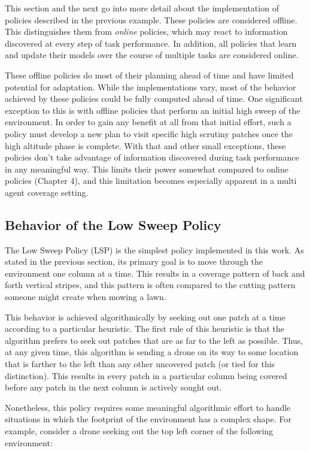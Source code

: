 This section and the next go into more detail about the implementation of policies described in the previous example. These policies are considered offline. This distinguishes them from \textit{online} policies, which may react to information discovered at every step of task performance. In addition, all policies that learn and update their models over the course of multiple tasks are considered online.

These offline policies do most of their planning ahead of time and have limited potential for adaptation. While the implementations vary, most of the behavior achieved by these policies could be fully computed ahead of time. One significant exception to this is with offline policies that perform an initial high sweep of the environment. In order to gain any benefit at all from that initial effort, such a policy must develop a new plan to visit specific high scrutiny patches once the high altitude phase is complete. With that and other small exceptions, these policies don't take advantage of information discovered during task performance in any meaningful way. This limits their power somewhat compared to online policies (Chapter 4), and this limitation becomes especially apparent in a multi agent coverage setting.

\subsection{Behavior of the Low Sweep Policy}

The Low Sweep Policy (LSP) is the simplest policy implemented in this work. As stated in the previous section, its primary goal is to move through the environment one column at a time. This results in a coverage pattern of back and forth vertical stripes, and this pattern is often compared to the cutting pattern someone might create when mowing a lawn. 

This behavior is achieved algorithmically by seeking out one patch at a time according to a particular heuristic. The first rule of this heuristic is that the algorithm prefers to seek out patches that are as far to the left as possible. Thus, at any given time, this algorithm is sending a drone on its way to some location that is farther to the left than any other uncovered patch (or tied for this distinction). This results in every patch in a particular column being covered before any patch in the next column is actively sought out.

Nonetheless, this policy requires some meaningful algorithmic effort to handle situations in which the footprint of the environment has a complex shape. For example, consider a drone seeking out the top left corner of the following environment:

